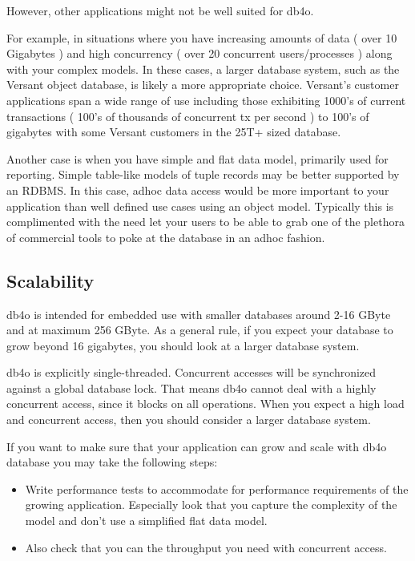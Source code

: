 However, other applications might not be well suited for db4o.

For example, in situations where you have increasing amounts of data ( over 10 Gigabytes ) and high concurrency ( over 20 concurrent users/processes ) along with your complex models. In these cases, a larger database system, such as the Versant object database, is likely a more appropriate choice. Versant's customer applications span a wide range of use including those exhibiting 1000's of current transactions ( 100's of thousands of concurrent tx per second ) to 100's of gigabytes with some Versant customers in the 25T+ sized database.

Another case is when you have simple and flat data model, primarily used for reporting. Simple table-like models of tuple records may be better supported by an RDBMS. In this case, adhoc data access would be more important to your application than well defined use cases using an object model. Typically this is complimented with the need let your users to be able to grab one of the plethora of commercial tools to poke at the database in an adhoc fashion.

\subsection{Scalability}
\label{ref:product-philosophy-scalability}

db4o is intended for embedded use with smaller databases around 2-16 GByte and at maximum 256 GByte. As a general rule, if you expect your database to grow beyond 16 gigabytes, you should look at a larger database system.

db4o is explicitly single-threaded. Concurrent accesses will be synchronized against a global database lock. That means db4o cannot deal with a highly concurrent access, since it blocks on all operations. When you expect a high load and concurrent access, then you should consider a larger database system.

If you want to make sure that your application can grow and scale with db4o database you may take the following steps:

\begin{itemize}
\item Write performance tests to accommodate for performance requirements of the growing application. Especially look that you capture the complexity of the model and don't use a simplified flat data model.
\item Also check that you can the throughput you need with concurrent access.
\end{itemize}


